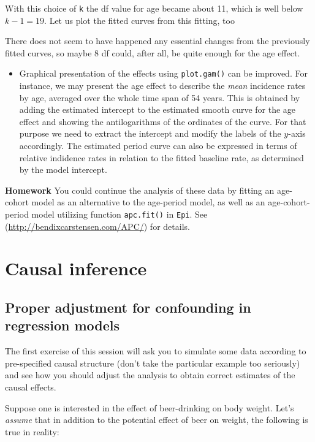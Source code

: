 \documentclass[
]{book}
\providecommand{\tightlist}{%
  \setlength{\itemsep}{0pt}\setlength{\parskip}{0pt}}
\begin{document}
With this choice of \texttt{k} the df value for age became about 11,
which is well below \(k-1 = 19\). Let us plot the fitted curves from
this fitting, too

There does not seem to have happened any essential changes from the
previously fitted curves, so maybe 8 df could, after all, be quite
enough for the age effect.

\begin{itemize}
\tightlist
\item
  Graphical presentation of the effects using \texttt{plot.gam()}
  can be improved. For instance, we may present the
  age effect to describe the \emph{mean} incidence rates by age, averaged
  over the whole time span of 54 years. This is obtained by adding
  the estimated intercept
  to the estimated smooth curve for the age effect and showing
  the antilogarithms of the ordinates of the curve.
  For that purpose we need to extract the intercept and modify the
  labels of the \(y\)-axis accordingly. The estimated period curve
  can also be expressed in terms of
  relative indidence rates in relation to the fitted baseline rate,
  as determined by the model intercept.
\end{itemize}

\textbf{Homework}
You could continue the analysis of these data by fitting an age-cohort
model as an alternative to the age-period model, as well as an
age-cohort-period model utilizing function \texttt{apc.fit()} in
\texttt{Epi}. See (\url{http://bendixcarstensen.com/APC/}) for details.

\chapter{Causal inference}\label{causal-inference}

\section{Proper adjustment for confounding in regression models}\label{proper-adjustment-for-confounding-in-regression-models}

The first exercise of this session will ask you to simulate some data
according to pre-specified causal structure (don't take the particular
example too seriously) and see how you should adjust the analysis to
obtain correct estimates of the causal effects.

Suppose one is interested in the effect of beer-drinking on body weight.
Let's \emph{assume} that in addition to the potential effect of beer on weight, the following is true in reality:
\end{document}
